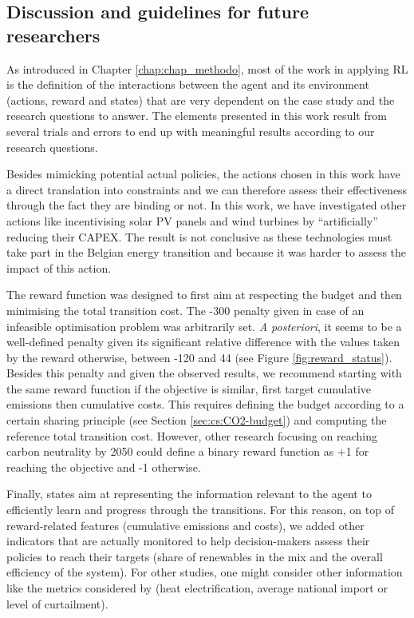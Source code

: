 \subsection{Discussion and guidelines for future researchers}
\label{subsec:RL:act_states_rew:discussion}
As introduced in Chapter \ref{chap:chap_methodo}, most of the work in applying \gls{RL} is the definition of the interactions between the agent and its environment (\ie actions, reward and states) that are very dependent on the case study and the research questions to answer. The elements presented in this work result from several trials and errors to end up with meaningful results according to our research questions.

Besides mimicking potential actual policies, the actions chosen in this work have a direct translation into constraints and we can therefore assess their effectiveness through the fact they are binding or not. In this work, we have investigated other actions like incentivising solar \gls{PV} panels and wind turbines by ``artificially'' reducing their \gls{CAPEX}. The result is not conclusive as these technologies must take part in the Belgian energy transition and because it was harder to assess the impact of this action. 

The reward function was designed to first aim at respecting the  budget and then minimising the total transition cost. The -300 penalty given in case of an infeasible optimisation problem was arbitrarily set. \textit{A posteriori}, it seems to be a well-defined penalty given its significant relative difference with the values taken by the reward otherwise, between -120 and 44 (see Figure \ref{fig:reward_status}). Besides this penalty and given the observed results, we recommend starting with the same reward function if the objective is similar, first target cumulative emissions then cumulative costs. This requires defining the  budget according to a certain sharing principle (see Section \ref{sec:cs:CO2-budget}) and computing the reference total transition cost. However, other research focusing on reaching carbon neutrality by 2050 could define a binary reward function as +1 for reaching the objective and -1 otherwise.

Finally, states aim at representing the information relevant to the agent to efficiently learn and progress through the transitions. For this reason, on top of reward-related features (cumulative emissions and costs), we added other indicators that are actually monitored to help decision-makers assess their policies to reach their targets (share of renewables in the mix and the overall efficiency of the system). For other studies, one might consider other information like the metrics considered by \citet{pickering2022diversity} (\eg heat electrification, average national import or level of curtailment).


